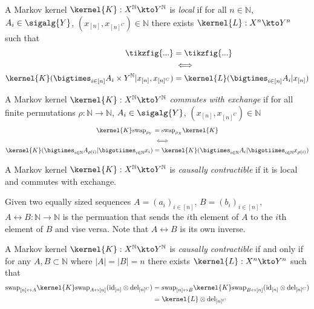 

\begin{definition}[Local]
A Markov kernel $\kernel{K}:X^{\mathbb{N}}\kto Y^{\mathbb{N}}$ is \emph{local} if for all $n\in \mathbb{N}$, $A_i\in \sigalg{Y}$, $(x_{[n]},x_{[n]^C})\in\mathbb{N}$ there exists $\kernel{L}:X^n\kto Y^n$ such that
\begin{align}
	\tikzfig{...} &= \tikzfig{...}\\
	&\iff\\
	\kernel{K}(\bigtimes_{i\in [n]} A_i\times Y^{\mathbb{N}}|x_{[n]},x_{[n]^C}) &= \kernel{L}(\bigtimes_{i\in [n]} A_i|x_{[n]})
\end{align}
\end{definition}

\begin{definition}
A Markov kernel $\kernel{K}:X^{\mathbb{N}}\kto Y^{\mathbb{N}}$ \emph{commutes with exchange} if for all finite permutations $\rho:\mathbb{N}\to\mathbb{N}$, $A_i\in \sigalg{Y}$, $(x_{[n]},x_{[n]^C})\in\mathbb{N}$
\begin{align}
	\kernel{K}\mathrm{swap}_{\rho_Y} &=  \mathrm{swap}_{\rho_X} \kernel{K}\\
	&\iff\\
	\kernel{K}(\bigtimes_{i\in\mathbb{N}} A_{\rho(i)}|\bigotiimes_{i\in \mathbb{N}} x_i) &= \kernel{K}(\bigtimes_{i\in\mathbb{N}} A_{i}|\bigotiimes_{i\in \mathbb{N}} x_{\rho(i)})
\end{align}
\end{definition}


\begin{definition}
A Markov kernel $\kernel{K}:X^{\mathbb{N}}\kto Y^{\mathbb{N}}$ is \emph{causally contractible} if it is local and commutes with exchange.
\end{definition}

\begin{definition}
Given two equally sized sequences $A=(a_i)_{i\in [n]}$, $B=(b_i)_{i\in [n]}$, ${A\leftrightarrow B}:\mathbb{N}\to \mathbb{N}$ is the permuation that sends the $i$th element of $A$ to the $i$th element of $B$ and vise versa. Note that $A\leftrightarrow B$ is its own inverse.
\end{definition}

\begin{theorem}\label{th:equal_of_condits}
A Markov kernel $\kernel{K}:X^{\mathbb{N}}\kto Y^{\mathbb{N}}$ is \emph{causally contractible} if and only if for any $A,B\subset \mathbb{N}$ where $|A|=|B|=n$ there exists $\kernel{L}:X^n\kto Y^n$ such that
\begin{align}
    \text{swap}_{[n]\leftrightarrow A} \kernel{K} \text{swap}_{A\leftrightarrow [n]} (\text{id}_{[n]}\otimes \text{del}_{[n]^C}) &= \text{swap}_{[n]\leftrightarrow B} \kernel{K} \text{swap}_{B\leftrightarrow [n]} (\text{id}_{[n]}\otimes \text{del}_{[n]^C})\\
    &= \kernel{L}\otimes \mathrm{del}_{[n]^C}
\end{align}
\end{theorem}

